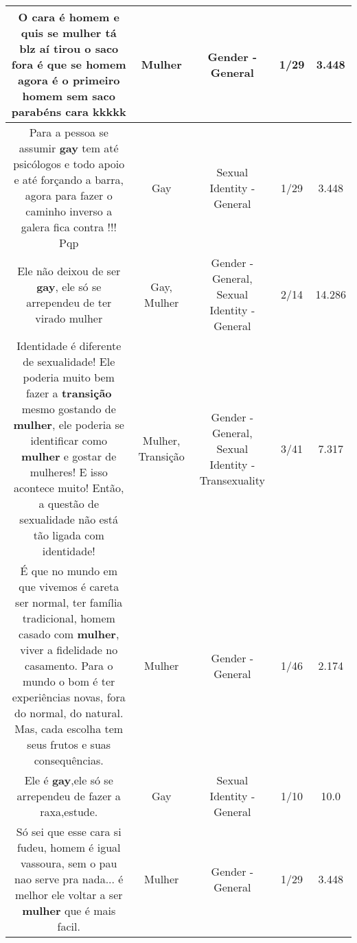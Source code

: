 \documentclass[11pt]{article}
\newlength\mylength
\begin{document}
\begin{center}
\begin{longtable}{|C{.65\mylength}|C{.30\mylength}|C{.12\mylength}|C{.12\mylength}|C{.12\mylength}|}
  \small O cara é homem e quis se \textbf{mulher} tá blz aí tirou o saco fora é que se homem agora é o primeiro homem  sem saco parabéns cara kkkkk\normalsize   & Mulher & Gender - General & 1/29 & 3.448 \\  \hline
  \small Para a pessoa se assumir \textbf{gay} tem até psicólogos e todo apoio e até forçando a barra, agora para fazer o caminho inverso a galera fica contra !!! Pqp\normalsize   & Gay & Sexual Identity - General & 1/29 & 3.448 \\  \hline
  \small Ele não deixou de ser \textbf{gay}, ele só se arrependeu de ter virado mulher\normalsize   & Gay, Mulher & Gender - General, Sexual Identity - General & 2/14 & 14.286 \\  \hline
  \small Identidade é diferente de sexualidade! Ele poderia muito bem fazer a \textbf{transição} mesmo gostando de \textbf{mulher}, ele poderia se identificar como \textbf{mulher} e gostar de mulheres! E isso acontece muito! Então, a questão de sexualidade não está tão ligada  com identidade!\normalsize   & Mulher, Transição & Gender - General, Sexual Identity - Transexuality & 3/41 & 7.317 \\  \hline
  \small É que no mundo em que vivemos é careta ser normal, ter família tradicional,  homem casado com \textbf{mulher}, viver a fidelidade no casamento. Para o mundo o bom é ter experiências novas, fora do normal, do natural. Mas, cada escolha tem seus frutos e suas consequências.\normalsize   & Mulher & Gender - General & 1/46 & 2.174 \\  \hline
  \small Ele é \textbf{gay},ele só se arrependeu de fazer a raxa,estude.\normalsize   & Gay & Sexual Identity - General & 1/10 & 10.0 \\  \hline
  \small Só sei que esse cara si fudeu, homem é igual vassoura, sem o pau nao serve pra nada... é melhor ele voltar a ser \textbf{mulher} que é mais facil.\normalsize   & Mulher & Gender - General & 1/29 & 3.448 \\  \hline

\end{longtable}
\end{center}
\end{document}
